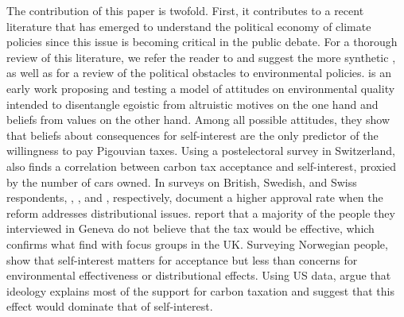 \documentclass[12pt]{article} %
\begin{document}
The contribution of this paper is twofold. First, it contributes to a recent literature that has emerged to understand the political economy of climate policies since this issue is becoming critical in the public debate. For a thorough review of this literature, we refer the reader to \citet{carattini_overcoming_2018} and suggest the more synthetic \citet{klenert_making_2018}, as well as \citet{millner_beliefs_2016} for a review of the political obstacles to environmental policies. \citet{stern_value_1993} is an early work proposing and testing a model of attitudes on environmental quality intended to disentangle egoistic from altruistic motives on the one hand and beliefs from values on the other hand. Among all possible attitudes, they show that beliefs about consequences for self-interest are the only predictor of the willingness to pay Pigouvian taxes. Using a postelectoral survey in Switzerland, \citet{thalmann_public_2004} also finds a correlation between carbon tax acceptance and self-interest, proxied by the number of cars owned. In surveys on British, Swedish, and Swiss respondents, \citet{bristow_public_2010}, \citet{brannlund_tax_2012}, and \citet{carattini_green_2017}, respectively, document a higher approval rate when the reform addresses distributional issues. \citet{baranzini_effectiveness_2017} report that a majority of the people they interviewed in Geneva do not believe that the tax would be effective, which confirms what \citet{dresner_history_2006} find with focus groups in the UK. Surveying Norwegian people, \citet{kallbekken_saelen_2011} show that self-interest matters for acceptance but less than concerns for environmental effectiveness or distributional effects. Using US data, \citet{anderson_can_2019} argue that ideology explains most of the support for carbon taxation and suggest that this effect would dominate that of self-interest.
\end{document}
